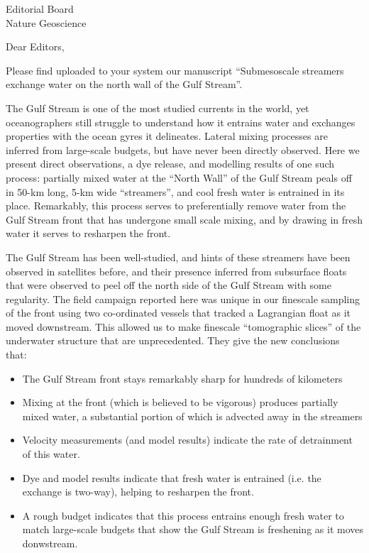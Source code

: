 \documentclass[jmkletter]{scrlttr2}
\begin{document}
  
  \begin{letter}{Editorial Board\\Nature Geoscience
}
    \opening{Dear Editors,}

Please find uploaded to your system our manuscript ``Submesoscale streamers exchange water on the north wall of the Gulf Stream''.  

The Gulf Stream is one of the most studied currents in the world, yet oceanographers still struggle to understand how it entrains water and exchanges properties with the ocean gyres it delineates. Lateral mixing processes are inferred from large-scale budgets, but have never been directly observed.  Here we present direct observations, a dye release, and modelling results of one such process:  partially mixed water at the ``North Wall'' of the Gulf Stream peals off in 50-km long, 5-km wide ``streamers'', and cool fresh water is entrained in its place.  Remarkably, this process serves to preferentially remove water from the Gulf Stream front that has undergone small scale mixing, and by drawing in fresh water it serves to resharpen the front.  

The Gulf Stream has been well-studied, and hints of these streamers have been observed in satellites before, and their presence inferred from subsurface floats that were observed to peel off the north side of the Gulf Stream with some regularity.  The field campaign reported here was unique in our finescale sampling of the front using two co-ordinated vessels that tracked a Lagrangian float as it moved downstream.  This allowed us  to make finescale ``tomographic slices'' of the underwater structure that are unprecedented.  They give the new conclusions that:
\begin{itemize}
  \item The Gulf Stream front stays remarkably sharp for hundreds of kilometers
  \item Mixing at the front (which is believed to be vigorous) produces partially mixed water, a substantial portion of which is advected away in the streamers
  \item Velocity measurements (and model results) indicate the rate of detrainment of this water.
  \item Dye and model results indicate that fresh water is entrained (i.e. the exchange is two-way), helping to resharpen the front.
  \item A rough budget indicates that this process  entrains enough fresh water to match large-scale budgets that show the Gulf Stream is freshening as it moves donwstream.  
\end{itemize}


\end{letter}
\end{document}

